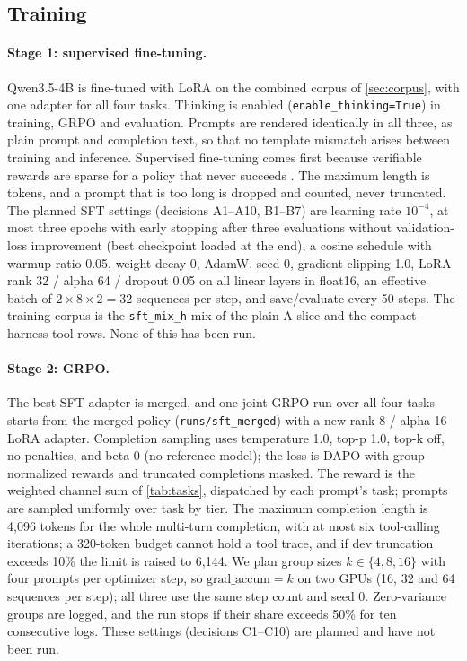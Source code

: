 \subsection{Training}\label{sec:training}

\paragraph{Stage 1: supervised fine-tuning.}
Qwen3.5-4B is fine-tuned with LoRA on the combined corpus of \cref{sec:corpus}, with one adapter for all four tasks. Thinking is enabled (\texttt{enable\_thinking=True}) in training, GRPO and evaluation. Prompts are rendered identically in all three, as plain prompt and completion text, so that no template mismatch arises between training and
inference. Supervised fine-tuning comes first because verifiable rewards are sparse for a policy that never succeeds \citep{lambert2024tulu3}. The maximum length is  tokens, and a prompt that is too long is dropped and counted, never truncated.
The planned SFT settings (decisions A1--A10, B1--B7) are learning rate $10^{-4}$, at most three epochs with early stopping after three evaluations without validation-loss improvement (best checkpoint loaded at the end), a cosine schedule with warmup ratio 0.05, weight decay 0, AdamW, seed 0, gradient clipping 1.0, LoRA rank 32 / alpha 64 / dropout 0.05 on all linear layers in float16, an effective batch of $2\times8\times2=32$ sequences per step, and save/evaluate every 50 steps. The training corpus is the \texttt{sft\_mix\_h} mix of the plain A-slice and the compact-harness tool rows. None of this has been run.

\paragraph{Stage 2: GRPO.}
The best SFT adapter is merged, and one joint GRPO run over all four tasks starts from the merged policy (\texttt{runs/sft\_merged}) with a new rank-8 / alpha-16 LoRA adapter. Completion sampling uses temperature 1.0, top-p 1.0, top-k off, no penalties, and beta 0 (no reference model); the loss is DAPO \citep{yu2025dapo} with group-normalized rewards and truncated completions masked. The reward is the weighted channel sum of \cref{tab:tasks}, dispatched by each prompt's task; prompts are sampled uniformly over task by tier. The maximum completion length is 4,096 tokens for the whole multi-turn completion, with at most six tool-calling iterations; a 320-token budget cannot hold a tool trace, and if dev truncation exceeds 10\% the limit is raised to 6,144. We plan group sizes $k\in\{4,8,16\}$ with four prompts per optimizer step, so $\mathrm{grad\_accum}=k$ on two GPUs (16, 32 and 64 sequences per step); all three use the same step count and seed 0. Zero-variance groups are logged, and the run stops if their share exceeds 50\% for ten consecutive logs. These settings (decisions C1--C10) are planned and have not been run.

